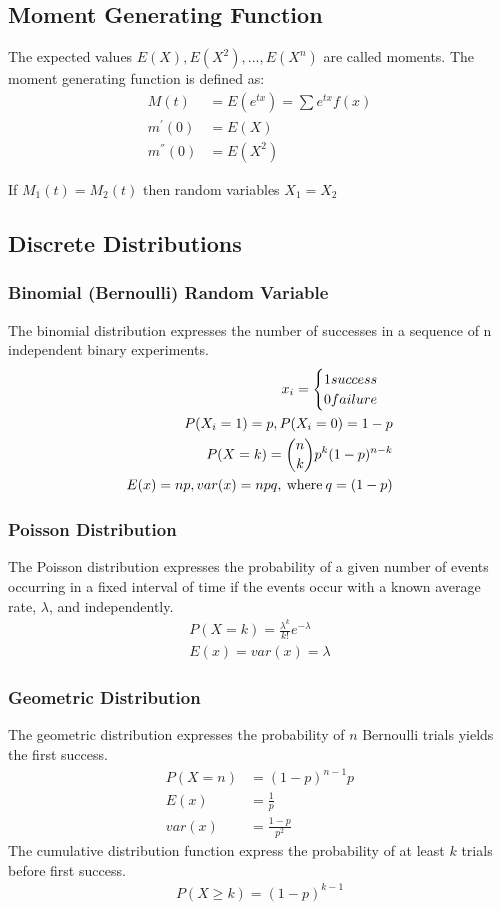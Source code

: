 \documentclass[12pt]{article}
\begin{document}
\subsection{Moment Generating Function}
The expected values $E(X), E(X^2), ..., E(X^n)$ are called moments. The moment generating function is defined as:
\begin{align*}
	M(t) &= E(e^{tx}) = \sum e^{tx}f(x) \\
	m^{'}(0) &= E(X) \\
	m^{''}(0) &= E(X^2)
\end{align*}

If $M_1 (t) = M_2 (t)$ then random variables $X_1 = X_2$

\subsection{Discrete Distributions}
\subsubsection{Binomial (Bernoulli) Random Variable}
The binomial distribution expresses the number of successes in a sequence of n independent binary experiments.
\begin{align*}
	x_i = \begin{cases}
	1 success \\
	0 failure
	\end{cases} \\
	P(X_i = 1) = p, P(X_i=0) = 1 - p \\
	P(X=k) = \dbinom{n}{k}p^k (1-p)^{n-k} \\
	E(x)=np, var(x) = npq, \: \text{where} \: q=(1-p)
\end{align*}

\subsubsection{Poisson Distribution}
The Poisson distribution expresses the probability of a given number of events occurring in a fixed interval of time if the events occur with a known average rate, $\lambda$, and independently. 
\begin{align*}
	P(X=k) = \frac{\lambda^k}{k!}e^{-\lambda} \\
	E(x) = var(x) = \lambda	
\end{align*}

\subsubsection{Geometric Distribution}
The geometric distribution expresses the probability of $n$ Bernoulli trials yields the first success.
\begin{align*}
	P(X=n) &= (1 - p)^{n-1} p\\
	E(x) &= \frac{1}{p} \\
	var(x) &= \frac{1-p}{p^2}
\end{align*}
The cumulative distribution function express the probability of at least $k$ trials before first success.
\begin{align*}
P(X\ge k) = (1-p)^{k-1}
\end{align*}
\end{document}
